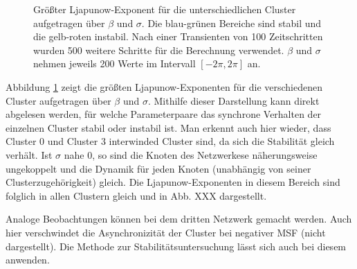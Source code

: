 \begin{figure}[h]
{	}
	\caption{Größter Ljapunow-Exponent für die unterschiedlichen Cluster aufgetragen über $\beta$ und $\sigma$. Die blau-grünen Bereiche sind stabil und die gelb-roten instabil. Nach einer Transienten von 100 Zeitschritten wurden 500 weitere Schritte für die Berechnung verwendet. $\beta$ und $\sigma$ nehmen jeweils 200 Werte im Intervall $[-2\pi,2\pi]$ an.}
	\label{fig:2dplots}	
\end{figure}
Abbildung \ref{fig:2dplots} zeigt die größten Ljapunow-Exponenten für die verschiedenen Cluster aufgetragen über $\beta$ und $\sigma$. Mithilfe dieser Darstellung kann direkt abgelesen werden, für welche Parameterpaare das synchrone Verhalten der einzelnen Cluster stabil oder instabil ist. Man erkennt auch hier wieder, dass Cluster 0 und Cluster 3 interwinded Cluster sind, da sich die Stabilität gleich verhält. Ist $\sigma$ nahe 0, so sind die Knoten des Netzwerkese näherungsweise ungekoppelt und die Dynamik für jeden Knoten (unabhängig von seiner Clusterzugehörigkeit) gleich. Die Ljapunow-Exponenten in diesem Bereich sind folglich in allen Clustern gleich und in Abb. XXX dargestellt. 

Analoge Beobachtungen können bei dem dritten Netzwerk gemacht werden. Auch hier verschwindet die Asynchronizität der Cluster bei negativer MSF (nicht dargestellt). Die Methode zur Stabilitätsuntersuchung lässt sich auch bei diesem anwenden.